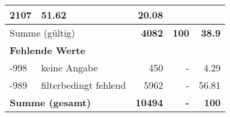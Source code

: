 \begin{longtable}{lXrrr}
       \num{2107} &
       \num[round-mode=places,round-precision=2]{51,62} &
         \num[round-mode=places,round-precision=2]{20,08} \\
     \midrule
     \multicolumn{2}{l}{Summe (gültig)} &
       \textbf{\num{4082}} &
     \textbf{100} &
       \textbf{\num[round-mode=places,round-precision=2]{38,9}} \\
     \multicolumn{5}{l}{\textbf{Fehlende Werte}}\\
       -998 &
       keine Angabe &
         \num{450} &
        - &
         \num[round-mode=places,round-precision=2]{4,29} \\
       -989 &
       filterbedingt fehlend &
         \num{5962} &
        - &
         \num[round-mode=places,round-precision=2]{56,81} \\
     \midrule
     \multicolumn{2}{l}{\textbf{Summe (gesamt)}} &
          \textbf{\num{10494}} &
        \textbf{-} &
        \textbf{100} \\
     \bottomrule
     \end{longtable}
     
